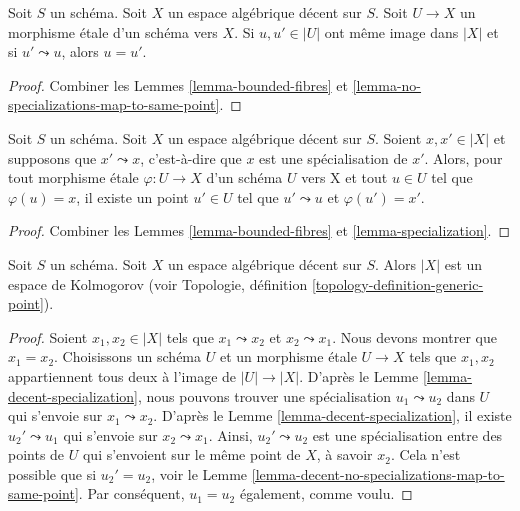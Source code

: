 \begin{lemma}
\label{lemma-decent-no-specializations-map-to-same-point}
Soit $S$ un schéma. Soit $X$ un espace algébrique décent sur $S$.
Soit $U \to X$ un morphisme \'etale d'un schéma vers $X$.
Si $u, u' \in |U|$ ont même image dans $|X|$ et si
$u' \leadsto u$, alors $u = u'$.
\end{lemma}

\begin{proof}
Combiner les Lemmes \ref{lemma-bounded-fibres} et
\ref{lemma-no-specializations-map-to-same-point}.
\end{proof}

\begin{lemma}
\label{lemma-decent-specialization}
Soit $S$ un schéma. Soit $X$ un espace algébrique décent sur $S$.
Soient $x, x' \in |X|$ et supposons que $x' \leadsto x$, c'est-à-dire que
$x$ est une spécialisation de $x'$. Alors, pour tout morphisme \'etale
$\varphi : U \to X$ d'un schéma $U$ vers X et tout $u \in U$ tel que
$\varphi(u) = x$, il existe un point $u'\in U$ tel que
$u' \leadsto u$ et $\varphi(u') = x'$.
\end{lemma}

\begin{proof}
Combiner les Lemmes \ref{lemma-bounded-fibres} et
\ref{lemma-specialization}.
\end{proof}

\begin{lemma}
\label{lemma-kolmogorov}
Soit $S$ un schéma. Soit $X$ un espace algébrique décent sur $S$.
Alors $|X|$ est un espace de Kolmogorov (voir
Topologie, définition \ref{topology-definition-generic-point}).
\end{lemma}

\begin{proof}
Soient $x_1, x_2 \in |X|$ tels que $x_1 \leadsto x_2$ et
$x_2 \leadsto x_1$. Nous devons montrer que $x_1 = x_2$. Choisissons un
schéma $U$ et un morphisme \'etale $U \to X$ tels que $x_1, x_2$
appartiennent tous deux à l'image de $|U| \to |X|$. D'après le
Lemme \ref{lemma-decent-specialization}, nous pouvons trouver une spécialisation
$u_1 \leadsto u_2$ dans $U$ qui s'envoie sur $x_1 \leadsto x_2$.
D'après le Lemme \ref{lemma-decent-specialization}, il existe
$u_2' \leadsto u_1$ qui s'envoie sur $x_2 \leadsto x_1$. Ainsi,
$u_2' \leadsto u_2$ est une spécialisation entre des points de $U$ qui
s'envoient sur le même point de $X$, à savoir $x_2$. Cela n'est possible que
si $u_2' = u_2$, voir le
Lemme \ref{lemma-decent-no-specializations-map-to-same-point}. Par conséquent,
$u_1 = u_2$ également, comme voulu.
\end{proof}

